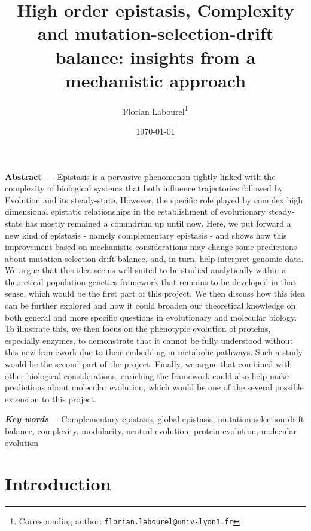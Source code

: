 \documentclass[11pt,onecolumn]{article}
\providecommand{\keywords}[1]{\textbf{\textit{Key words---}} #1}
\renewcommand{\abstract}[1]{\textbf{Abstract --- } #1}
\begin{document}
\title{High order epistasis, Complexity and mutation-selection-drift balance: insights from a mechanistic approach}
\date{\today}
\author[,1]{Florian Labourel\thanks{Corresponding author: \texttt{florian.labourel@univ-lyon1.fr}}}

 

  \maketitle
    
    \abstract{Epistasis is a pervasive phenomenon tightly linked with the complexity of biological systems that both influence trajectories followed by Evolution and its steady-state. However, the specific role played by complex high dimensional epistatic relationships in the establishment of evolutionary steady-state has mostly remained a conundrum up until now. Here, we put forward a new kind of epistasis - namely complementary epistasis - and shows how this improvement based on mechanistic considerations may change some predictions about mutation-selection-drift balance, and, in turn, help interpret genomic data. We argue that this idea seems well-suited to be studied analytically within a theoretical population genetics framework that remains to be developed in that sense, which would be the first part of this project. We then discuss how this idea can be further explored and how it could broaden our theoretical knowledge on both general and more specific questions in evolutionary and molecular biology. To illustrate this, we then focus on the phenotypic evolution of proteins, especially enzymes, to demonstrate that it cannot be fully understood without this new framework due to their embedding in metabolic pathways. Such a study would be the second part of the project. Finally, we argue that combined with other biological considerations, enriching the framework could also help make predictions about molecular evolution, which would be one of the several possible extension to this project.}

\keywords{Complementary epistasis, global epistasis, mutation-selection-drift balance, complexity, modularity, neutral evolution, protein evolution, molecular evolution}
\vspace{0.5cm}

\pagebreak

\section{{Introduction}\label{sec:Intro}}
\end{document}
